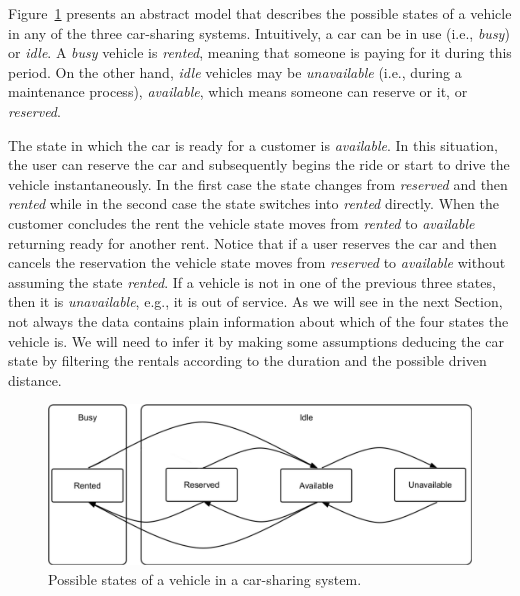 Figure~\ref{fig:diagrama} presents an abstract model that describes the possible states of a vehicle in any of the three car-sharing systems.
Intuitively, a car can be in use (i.e., \textit{busy}) or \textit{idle}. A \textit{busy} vehicle is \textit{rented}, meaning that someone is paying for it during this period. On the other hand, \textit{idle} vehicles may be \textit{unavailable} (i.e., during a maintenance process), \textit{available}, which means someone can reserve or it, or \textit{reserved}. 

The state in which the car is ready for a customer is \textit{available}. In this situation, the user can reserve the car and subsequently begins the ride or start to drive the vehicle instantaneously. In the first case the state changes from \textit{reserved} and then \textit{rented} while in the second case the state switches into \textit{rented} directly. When the customer concludes the rent the vehicle state moves from \textit{rented} to \textit{available} returning ready for another rent. Notice that if a user reserves the car and then cancels the reservation the vehicle state moves from \textit{reserved} to \textit{available} without assuming the state \textit{rented}. If a vehicle is not in one of the previous three states, then it is \textit{unavailable}, e.g., it is out of service. As we will see in the next Section, not always the data contains plain information about which of the four states the vehicle is. We will need to infer it by making some assumptions deducing the car state by filtering the rentals according to the duration and the possible driven distance.

\begin{figure}[tbh]
\centering
\includegraphics[width=1\textwidth]{imagens/diagrama_v4.pdf}
\caption{Possible states of a vehicle in a car-sharing system.}
\label{fig:diagrama}
\end{figure}